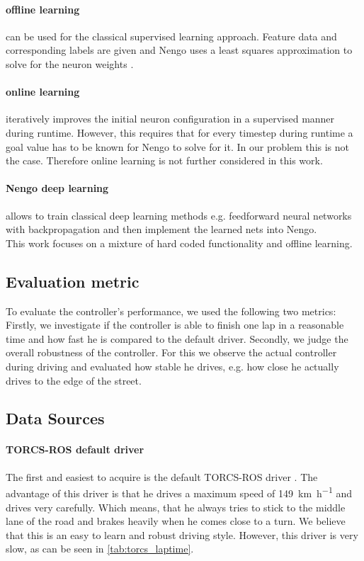 \documentclass[10pt,a4paper,twoside,journal]{IEEEtran}
\begin{document}
\paragraph{offline learning} can be used for the classical supervised learning approach. Feature data and corresponding labels are given and Nengo uses a least squares approximation to solve for the neuron weights \cite{nef}.

\paragraph{online learning} iteratively improves the initial neuron configuration in a supervised manner during runtime. However, this requires that for every timestep during runtime a goal value has to be known for Nengo to solve for it. In our problem this is not the case. Therefore online learning is not further considered in this work.

\paragraph{Nengo deep learning} allows to train classical deep learning methods e.g. feedforward neural networks with backpropagation and then implement the learned nets into Nengo. \\
This work focuses on a mixture of hard coded functionality and offline learning.

\subsection{Evaluation metric}
To evaluate the controller's performance, we used the following two metrics: Firstly, we investigate if the controller is able to finish one lap in a reasonable time and how fast he is compared to the default driver. Secondly, we judge the overall robustness of the controller. For this we observe the actual controller during driving and evaluated how stable he drives, e.g. how close he actually drives to the edge of the street.

\subsection{Data Sources}
\paragraph{TORCS-ROS default driver}
The first and easiest to acquire is the default TORCS-ROS driver \cite{mirus_torcs-ros_2017}. The advantage of this driver is that he drives a maximum speed of \SI{149}{\km\per\hour} and drives very carefully. Which means, that he always tries to stick to the middle lane of the road and brakes heavily when he comes close to a turn. We believe that this is an easy to learn and robust driving style. However, this driver is very slow, as can be seen in \autoref{tab:torcs_laptime}.
\end{document}
